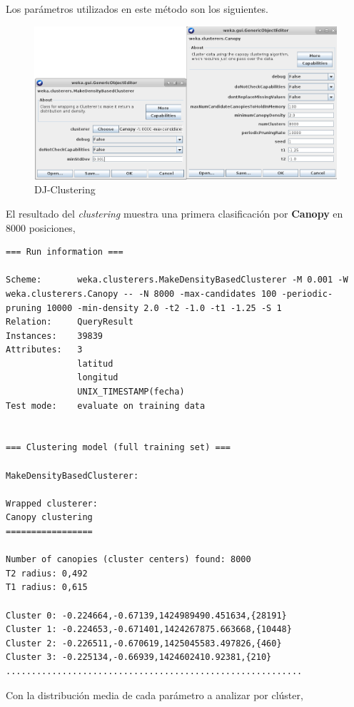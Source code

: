 \documentclass[a4paper, 12pt]{article}
\begin{document}
Los par\'ametros utilizados en este m\'etodo son los siguientes.\\

\begin{figure}[!htbp]
\centering
	\includegraphics[scale=.55]{wekaDJClusterParametersTotal.png}
\caption{DJ-Clustering}
\end{figure}


El resultado del \textit{clustering} muestra una primera clasificaci\'on por \textbf{Canopy} en $8000$ posiciones,\\

\begin{verbatim}
=== Run information ===

Scheme:       weka.clusterers.MakeDensityBasedClusterer -M 0.001 -W weka.clusterers.Canopy -- -N 8000 -max-candidates 100 -periodic-pruning 10000 -min-density 2.0 -t2 -1.0 -t1 -1.25 -S 1
Relation:     QueryResult
Instances:    39839
Attributes:   3
              latitud
              longitud
              UNIX_TIMESTAMP(fecha)
Test mode:    evaluate on training data


=== Clustering model (full training set) ===

MakeDensityBasedClusterer: 

Wrapped clusterer: 
Canopy clustering
=================

Number of canopies (cluster centers) found: 8000
T2 radius: 0,492     
T1 radius: 0,615     

Cluster 0: -0.224664,-0.67139,1424989490.451634,{28191}
Cluster 1: -0.224653,-0.671401,1424267875.663668,{10448} 
Cluster 2: -0.226511,-0.670619,1425045583.497826,{460}
Cluster 3: -0.225134,-0.66939,1424602410.92381,{210}
..........................................................
\end{verbatim}


Con la distribuci\'on media de cada par\'ametro a analizar por cl\'uster,\\
\end{document}
